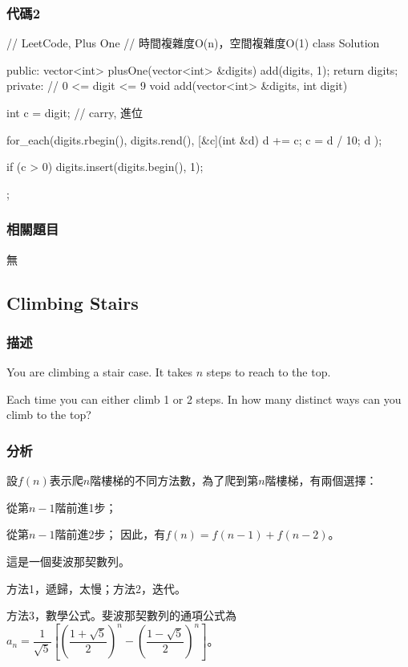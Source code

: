 \subsubsection{代碼2}
\begin{Code}
// LeetCode, Plus One
// 時間複雜度O(n)，空間複雜度O(1)
class Solution {
public:
    vector<int> plusOne(vector<int> &digits) {
        add(digits, 1);
        return digits;
    }
private:
    // 0 <= digit <= 9
    void add(vector<int> &digits, int digit) {
        int c = digit;  // carry, 進位

        for_each(digits.rbegin(), digits.rend(), [&c](int &d){
            d += c;
            c = d / 10;
            d %
        });

        if (c > 0) digits.insert(digits.begin(), 1);
    }
};
\end{Code}


\subsubsection{相關題目}
\begindot
\item 無
\myenddot


\subsection{Climbing Stairs} %
\label{sec:climbing-stairs}


\subsubsection{描述}
You are climbing a stair case. It takes $n$ steps to reach to the top.

Each time you can either climb 1 or 2 steps. In how many distinct ways can you climb to the top?


\subsubsection{分析}
設$f(n)$表示爬$n$階樓梯的不同方法數，為了爬到第$n$階樓梯，有兩個選擇：
\begindot
\item 從第$n-1$階前進1步；
\item 從第$n-1$階前進2步；
\myenddot
因此，有$f(n)=f(n-1)+f(n-2)$。

這是一個斐波那契數列。

方法1，遞歸，太慢；方法2，迭代。

方法3，數學公式。斐波那契數列的通項公式為 $a_n=\dfrac{1}{\sqrt{5}}\left[\left(\dfrac{1+\sqrt{5}}{2}\right)^n-\left(\dfrac{1-\sqrt{5}}{2}\right)^n\right]$。


